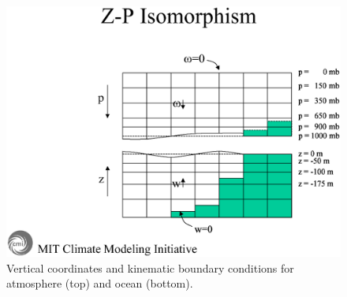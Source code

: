 \begin{figure}
  \begin{center}
   \includegraphics*[trim=210 80 70 140,width=.9\textwidth]{s_overview/figs/vertcoord.eps}
  \end{center}
\caption{Vertical coordinates and kinematic boundary conditions
for atmosphere (top) and ocean (bottom).}
\label{fig:zandp-vert-coord}
\end{figure}
